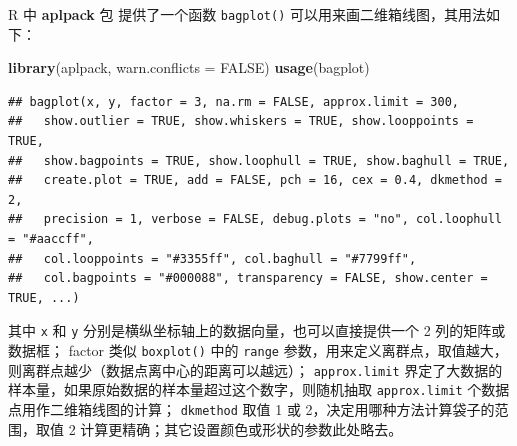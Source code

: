 \documentclass[
  b5paper,
  UTF8,twoside]{book}
\newenvironment{Shaded}{\begin{snugshade}}{\end{snugshade}}
\newcommand{\AttributeTok}[1]{\textcolor[rgb]{0.13,0.29,0.53}{#1}}
\newcommand{\ConstantTok}[1]{\textcolor[rgb]{0.56,0.35,0.01}{#1}}
\newcommand{\FunctionTok}[1]{\textcolor[rgb]{0.13,0.29,0.53}{\textbf{#1}}}
\newcommand{\NormalTok}[1]{#1}
\begin{document}
R 中 \textbf{aplpack} 包 \citep{aplpack} 提供了一个函数 \texttt{bagplot()} 可以用来画二维箱线图，其用法如下：

\begin{Shaded}
\begin{Highlighting}[]
\FunctionTok{library}\NormalTok{(aplpack, }\AttributeTok{warn.conflicts =} \ConstantTok{FALSE}\NormalTok{)}
\FunctionTok{usage}\NormalTok{(bagplot)}
\end{Highlighting}
\end{Shaded}

\begin{verbatim}
## bagplot(x, y, factor = 3, na.rm = FALSE, approx.limit = 300,
##   show.outlier = TRUE, show.whiskers = TRUE, show.looppoints = TRUE,
##   show.bagpoints = TRUE, show.loophull = TRUE, show.baghull = TRUE,
##   create.plot = TRUE, add = FALSE, pch = 16, cex = 0.4, dkmethod = 2,
##   precision = 1, verbose = FALSE, debug.plots = "no", col.loophull = "#aaccff",
##   col.looppoints = "#3355ff", col.baghull = "#7799ff",
##   col.bagpoints = "#000088", transparency = FALSE, show.center = TRUE, ...)
\end{verbatim}

其中 \texttt{x} 和 \texttt{y} 分别是横纵坐标轴上的数据向量，也可以直接提供一个 2 列的矩阵或数据框； factor 类似 \texttt{boxplot()} 中的 \texttt{range} 参数，用来定义离群点，取值越大，则离群点越少（数据点离中心的距离可以越远）； \texttt{approx.limit} 界定了大数据的样本量，如果原始数据的样本量超过这个数字，则随机抽取 \texttt{approx.limit} 个数据点用作二维箱线图的计算； \texttt{dkmethod} 取值 1 或 2，决定用哪种方法计算袋子的范围，取值 2 计算更精确；其它设置颜色或形状的参数此处略去。
\end{document}
